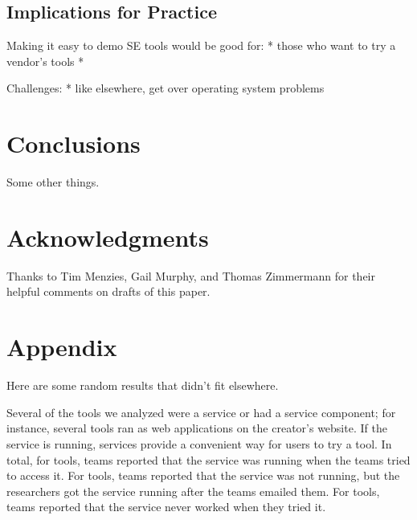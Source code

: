\documentclass[10pt,conference]{IEEEtran}
\begin{document}
\subsection{Implications for Practice}

Making it easy to demo SE tools would be good for:
* those who want to try a vendor's tools
*  

Challenges:
* like elsewhere, get over operating system problems

\section{Conclusions}

Some other things.

\section*{Acknowledgments}

Thanks to Tim Menzies, Gail Murphy, and Thomas Zimmermann
for their helpful comments on drafts of this paper.  





\section{Appendix}

Here are some random results that didn't fit elsewhere.

Several of the tools we analyzed were a service or had a
service component; for instance, several tools
ran as web applications on the creator's website.
If the service is running, services provide a convenient way
for users to try a tool.
In total, for \serviceRunning tools, teams 
reported that the service was running when the teams tried
to access it.
For \serviceRunningLater tools, teams reported that the service
was not running, but the researchers got the service running
after the teams emailed them.
For \serviceRunningNever tools, teams reported that the service
never worked when they tried it.  
\end{document}
